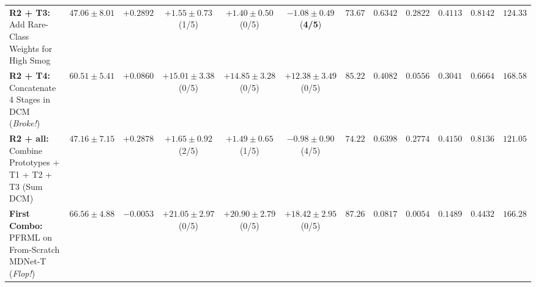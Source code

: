\documentclass[conference]{IEEEtran}
\begin{document}
\begin{table}[t]
{\begin{tabular}{lccccccccccc}
      \textbf{R2 + T3:} Add Rare-Class Weights for High Smog               &     $47.06 \pm 8.01$      &     $+0.2892$      &   $+1.55 \pm 0.73$ (1/5)    &   $+1.40 \pm 0.50$ (0/5)    & $\mathbf{-1.08 \pm 0.49}$ (\textbf{4/5}) &     $73.67$      &     $0.6342$      &      $0.2822$      &     $0.4113$      &             $0.8142$             &     $124.33$      \\
      \textbf{R2 + T4:} Concatenate 4 Stages in DCM (\textit{Broke!})      &     $60.51 \pm 5.41$      &     $+0.0860$      &   $+15.01 \pm 3.38$ (0/5)   &   $+14.85 \pm 3.28$ (0/5)   &         $+12.38 \pm 3.49$ (0/5)          &     $85.22$      &     $0.4082$      &      $0.0556$      &     $0.3041$      &             $0.6664$             &     $168.58$      \\
      \textbf{R2 + all:} Combine Prototypes + T1 + T2 + T3 (Sum DCM)       &     $47.16 \pm 7.15$      &     $+0.2878$      &   $+1.65 \pm 0.92$ (2/5)    &   $+1.49 \pm 0.65$ (1/5)    &          $-0.98 \pm 0.90$ (4/5)          &     $74.22$      &     $0.6398$      &      $0.2774$      & $\mathbf{0.4150}$ &             $0.8136$             &     $121.05$      \\
      \midrule
      \textbf{First Combo:} PFRML on From-Scratch MDNet-T (\textit{Flop!}) &     $66.56 \pm 4.88$      &     $-0.0053$      &   $+21.05 \pm 2.97$ (0/5)   &   $+20.90 \pm 2.79$ (0/5)   &         $+18.42 \pm 2.95$ (0/5)          &     $87.26$      &     $0.0817$      &      $0.0054$      &     $0.1489$      &             $0.4432$             &     $166.28$      \\
      \bottomrule
    \end{tabular}%
  }
\end{table}
\end{document}
